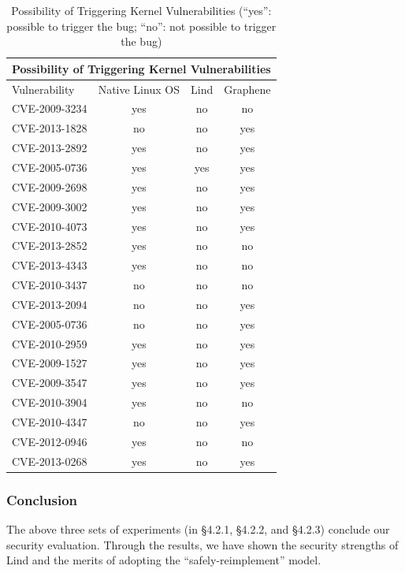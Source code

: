 \begin{table}[t]
\begin{tabular*}{\textwidth}{l @{\extracolsep{\fill}} ccc}
\toprule
\multicolumn{4}{c}{Possibility of Triggering Kernel Vulnerabilities} \\

\midrule
Vulnerability    &  Native Linux OS  &  Lind  &  Graphene \\
\midrule
 CVE-2009-3234 \cite{CVE:20093234} & yes & no & no \\
 CVE-2013-1828 \cite{CVE:20131828} & no & no & yes \\
 CVE-2013-2892 \cite{CVE:20132892} & yes & no & yes \\
 CVE-2005-0736 \cite{CVE:20050736} & yes & yes & yes \\
 CVE-2009-2698 \cite{CVE:20092698} & yes & no & yes \\
 CVE-2009-3002 \cite{CVE:20093002} & yes & no & yes \\
 CVE-2010-4073 \cite{CVE:20104073} & yes & no & yes \\
 CVE-2013-2852 \cite{CVE:20132852} & yes & no & no \\
 CVE-2013-4343 \cite{CVE:20134343} & yes & no & no \\
 CVE-2010-3437 \cite{CVE:20103437} & no & no & no \\
 CVE-2013-2094 \cite{CVE:20132094} & no & no & yes \\
 CVE-2005-0736 \cite{CVE:20050736} & no & no & yes \\
 CVE-2010-2959 \cite{CVE:20102959} & yes & no & yes \\
 CVE-2009-1527 \cite{CVE:20091527} & yes & no & yes \\
 CVE-2009-3547 \cite{CVE:20093547} & yes & no & yes \\
 CVE-2010-3904 \cite{CVE:20103904} & yes & no & no \\
 CVE-2010-4347 \cite{CVE:20104347} & no & no & yes \\
 CVE-2012-0946 \cite{CVE:20120946} & yes & no & no \\
 CVE-2013-0268 \cite{CVE:20130268} & yes & no & yes \\

\bottomrule
\end{tabular*}
\caption {Possibility of Triggering Kernel Vulnerabilities (``yes'': possible to trigger the bug; ``no'': not possible to trigger the bug)}
\label{table:trigger_vulnerabilities}
\end{table}


\subsubsection{Conclusion}

The above three sets of experiments (in \S4.2.1, \S4.2.2, and \S4.2.3) conclude our security evaluation. 
Through the results, we have shown the security strengths of Lind and the merits of adopting 
the ``safely-reimplement'' model. 


